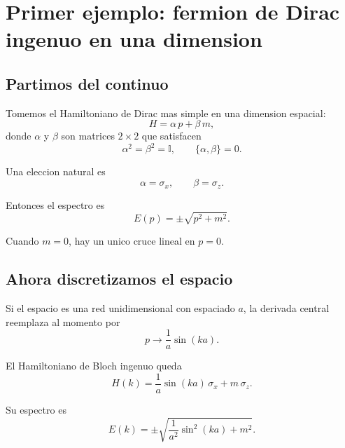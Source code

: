 \section{Primer ejemplo: fermion de Dirac ingenuo en una dimension}

\subsection{Partimos del continuo}

Tomemos el Hamiltoniano de Dirac mas simple en una dimension espacial:
\begin{equation}
H = \alpha\, p + \beta\, m,
\label{c26:eq:dirac-cont}
\end{equation}
donde \(\alpha\) y \(\beta\) son matrices \(2\times 2\) que satisfacen
\begin{equation}
\alpha^2 = \beta^2 = \mathbb{I},
\qquad
\{\alpha,\beta\}=0.
\end{equation}

Una eleccion natural es
\begin{equation}
\alpha = \sigma_x,
\qquad
\beta = \sigma_z.
\end{equation}

Entonces el espectro es
\begin{equation}
E(p) = \pm \sqrt{p^2 + m^2}.
\end{equation}

Cuando \(m=0\), hay un unico cruce lineal en \(p=0\).

\subsection{Ahora discretizamos el espacio}

Si el espacio es una red unidimensional con espaciado \(a\), la derivada central reemplaza al momento por
\begin{equation}
p \longrightarrow \frac{1}{a}\sin(ka).
\end{equation}

El Hamiltoniano de Bloch ingenuo queda
\begin{equation}
H(k) = \frac{1}{a}\sin(ka)\,\sigma_x + m\,\sigma_z.
\label{c26:eq:naive-1d}
\end{equation}

Su espectro es
\begin{equation}
E(k)=\pm \sqrt{\frac{1}{a^2}\sin^2(ka)+m^2}.
\label{c26:eq:disp-naive-1d}
\end{equation}

